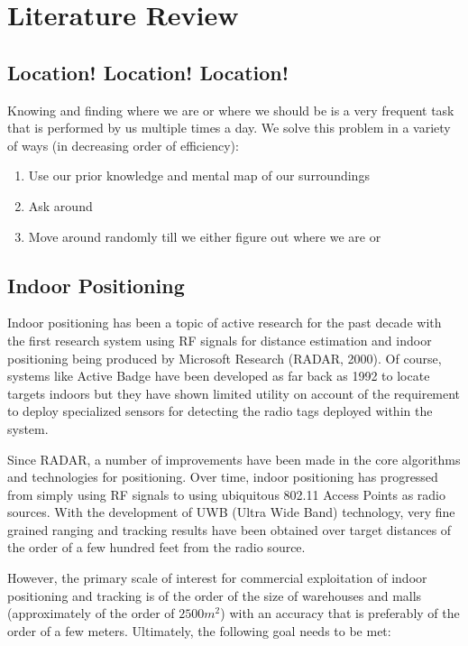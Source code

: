 \chapter{Literature Review\label{chap:literature_review}}

\section{Location! Location! Location!}

Knowing and finding where we are or where we should be is a very frequent 
task that is performed by us multiple times a day. We solve this problem 
in a variety of ways (in decreasing order of efficiency):

\begin{enumerate}
\item Use our prior knowledge and mental map of our surroundings
\item Ask around
\item Move around randomly till we either figure out where we are or 
\end{enumerate}

\section{Indoor Positioning}

Indoor positioning has been a topic of active research for the past decade with
the first research system using RF signals for distance estimation and indoor
positioning being produced by Microsoft Research (RADAR, 2000)\cite{RADAR}. Of
course, systems like Active Badge\cite{ActiveBadge} have been developed as far
back as 1992 to locate targets indoors but they have shown limited utility on
account of the requirement to deploy specialized sensors for detecting the radio
tags deployed within the system.

Since RADAR, a number of improvements have been made in the core algorithms and
technologies for positioning. Over time, indoor positioning has progressed from
simply using RF signals to using ubiquitous 802.11 Access Points as radio
sources. With the development of UWB (Ultra Wide Band) technology, very fine
grained ranging and tracking results have been obtained over target distances of
the order of a few hundred feet from the radio source.\cite{UWBRanging} 

However, the primary scale of interest for commercial exploitation of indoor
positioning and tracking is of the order of the size of warehouses and malls
(approximately of the order of $2500 m^2$) with an accuracy that is preferably
of the order of a few meters. Ultimately, the following goal needs to be met:

